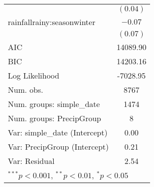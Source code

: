 \begin{table}
\begin{center}
\begin{tabular}{l c }
                                  & $(0.04)$      \\
rainfallrainy:seasonwinter        & $-0.07$       \\
                                  & $(0.07)$      \\
\hline
AIC                               & 14089.90      \\
BIC                               & 14203.16      \\
Log Likelihood                    & -7028.95      \\
Num. obs.                         & 8767          \\
Num. groups: simple\_date          & 1474          \\
Num. groups: PrecipGroup          & 8             \\
Var: simple\_date (Intercept)      & 0.00          \\
Var: PrecipGroup (Intercept)      & 0.21          \\
Var: Residual                     & 2.54          \\
\hline
\multicolumn{2}{l}{\scriptsize{$^{***}p<0.001$, $^{**}p<0.01$, $^*p<0.05$}}
\end{tabular}
\label{table:soil_moisture_model}
\end{center}
\end{table}
